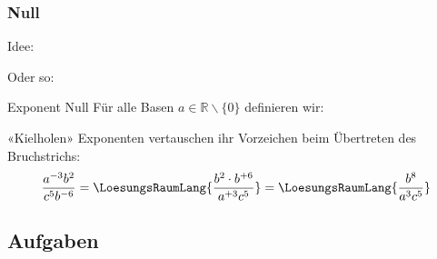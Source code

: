 \newpage



\subsubsection{Null}

Idee:

Oder so:

\begin{definition}{Exponent Null}{} Für alle Basen
$a \in \mathbb{R}\backslash\{0\}$ definieren wir:
\begin{center}
\end{center}
\end{definition}




 





\newpage

\begin{rezept*}{«Kielholen»}{}{}
Exponenten vertauschen ihr Vorzeichen beim Übertreten des Bruchstrichs:
$$\frac{a^{-3}b^2}{c^5b^{-6}} = \LoesungsRaumLang{\frac{b^2\cdot{}b^{+6}}{a^{+3}c^5}}= \LoesungsRaumLang{\frac{b^8}{a^3c^5}}$$
\end{rezept*}



\subsection{Aufgaben}

